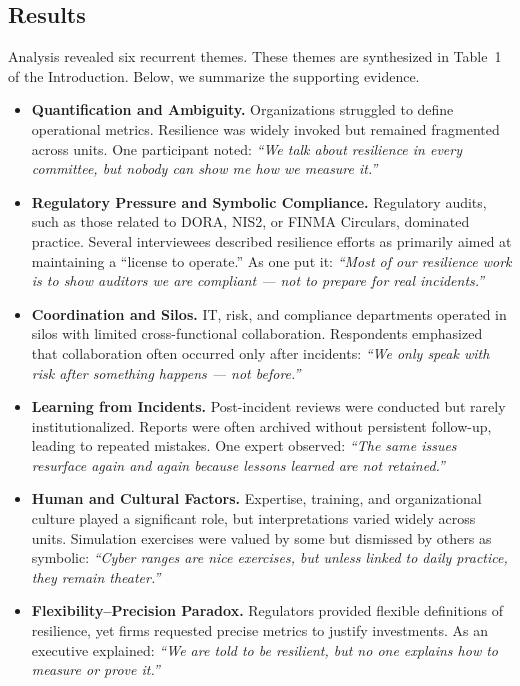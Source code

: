 \subsection{Results}
Analysis revealed six recurrent themes. These themes are synthesized in Table~1 of the Introduction. Below, we summarize the supporting evidence.

\begin{itemize}
    \item \textbf{Quantification and Ambiguity.} Organizations struggled to define operational metrics. Resilience was widely invoked but remained fragmented across units. One participant noted: \textit{“We talk about resilience in every committee, but nobody can show me how we measure it.”}
    
    \item \textbf{Regulatory Pressure and Symbolic Compliance.} Regulatory audits, such as those related to DORA, NIS2, or FINMA Circulars, dominated practice. Several interviewees described resilience efforts as primarily aimed at maintaining a “license to operate.” As one put it: \textit{“Most of our resilience work is to show auditors we are compliant — not to prepare for real incidents.”}
    
    \item \textbf{Coordination and Silos.} IT, risk, and compliance departments operated in silos with limited cross-functional collaboration. Respondents emphasized that collaboration often occurred only after incidents: \textit{“We only speak with risk after something happens — not before.”}
    
    \item \textbf{Learning from Incidents.} Post-incident reviews were conducted but rarely institutionalized. Reports were often archived without persistent follow-up, leading to repeated mistakes. One expert observed: \textit{“The same issues resurface again and again because lessons learned are not retained.”}
    
    \item \textbf{Human and Cultural Factors.} Expertise, training, and organizational culture played a significant role, but interpretations varied widely across units. Simulation exercises were valued by some but dismissed by others as symbolic: \textit{“Cyber ranges are nice exercises, but unless linked to daily practice, they remain theater.”}
    
    \item \textbf{Flexibility–Precision Paradox.} Regulators provided flexible definitions of resilience, yet firms requested precise metrics to justify investments. As an executive explained: \textit{“We are told to be resilient, but no one explains how to measure or prove it.”}\\
\end{itemize}

